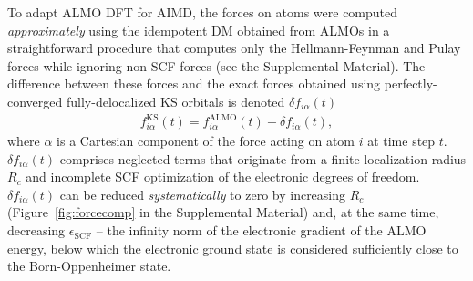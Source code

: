 \documentclass[aps,prl,reprint,amsmath,amssymb]{revtex4-1}
\begin{document}

To adapt ALMO DFT for AIMD, the forces on atoms were computed \emph{approximately} using the idempotent DM obtained from ALMOs in a straightforward procedure that computes only the Hellmann-Feynman and Pulay forces while ignoring non-SCF forces (see the Supplemental Material). 
The difference between these forces and the exact forces obtained using perfectly-converged fully-delocalized KS orbitals is denoted $\delta f_{i\alpha}(t)$ 
%
\begin{align}
\label{eq:deltaf}
f^{\text{KS}}_{i\alpha}(t) = f^{\text{ALMO}}_{i\alpha}(t) + \delta f_{i\alpha} (t),
\end{align}
%
where $\alpha$ is a Cartesian component of the force acting on atom $i$ at time step $t$. $\delta f_{i\alpha} (t)$ comprises neglected terms that originate from %
a finite localization radius $R_c$ and incomplete SCF optimization of the electronic degrees of freedom. 
$\delta f_{i\alpha} (t)$ can be reduced \emph{systematically} to zero by increasing $R_c$ (Figure~\ref{fig:forcecomp} in the Supplemental Material) and, at the same time, decreasing $\epsilon_{\text{SCF}}$ -- the infinity norm of the electronic gradient of the \mbox{ALMO} energy, below which the electronic ground state is considered sufficiently close to the Born-Oppenheimer state. 
\end{document}
